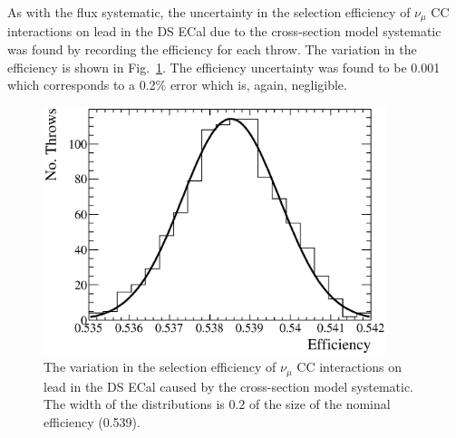 \newline
\newline
As with the flux systematic, the uncertainty in the selection efficiency of $\nu_\mu$ CC interactions on lead in the DS ECal due to the cross-section model systematic was found by recording the efficiency for each throw.  The variation in the efficiency is shown in Fig.~\ref{fig:XSecEfficiencyVariation}.  The efficiency uncertainty was found to be 0.001 which corresponds to a 0.2$\%$ error which is, again, negligible.
\begin{figure}[b!]
  \centering
  \includegraphics[width=10cm]{images/measurement/systematics/xsec/xsec_efficiency_variation.eps}
  \caption{The variation in the selection efficiency of $\nu_\mu$ CC interactions on lead in the DS ECal caused by the cross-section model systematic.  The width of the distributions is $0.2$ of the size of the nominal efficiency (0.539).}
  \label{fig:XSecEfficiencyVariation}
\end{figure}
\newline
\newline
